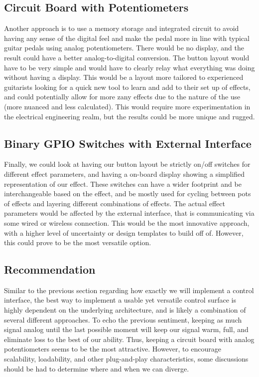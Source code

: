 \documentclass[onecolumn, draftclsnofoot,10pt, compsoc]{IEEEtran}
\begin{document}
\subsection{Circuit Board with Potentiometers}
	Another approach is to use a memory storage and integrated circuit to avoid having any sense of the digital feel and make the pedal more in line with typical guitar pedals using analog potentiometers. There would be no display, and the result could have a better analog-to-digital conversion. The button layout would have to be very simple and would have to clearly relay what everything was doing without having a display. This would be a layout more tailored to experienced guitarists looking for a quick new tool to learn and add to their set up of effects, and could potentially allow for more zany effects due to the nature of the use (more nuanced and less calculated). This would require more experimentation in the electrical engineering realm, but the results could be more unique and rugged\cite{Proto}. 
\subsection{Binary GPIO Switches with External Interface}
	Finally, we could look at having our button layout be strictly on/off switches for different effect parameters, and having a on-board display showing a simplified representation of our effect. These switches can have a wider footprint and be interchangeable based on the effect, and be mostly used for cycling between pots of effects and layering different combinations of effects. The actual effect parameters would be affected by the external interface, that is communicating via some wired or wireless connection. This would be the most innovative approach, with a higher level of uncertainty or design templates to build off of. However, this could prove to be the most versatile option. 
\subsection{Recommendation}
    Similar to the previous section regarding how exactly we will implement a control interface, the best way to implement a usable yet versatile control surface is highly dependent on the underlying architecture, and is likely a combination of several different approaches. To echo the previous sentiment, keeping as much signal analog until the last possible moment will keep our signal warm, full, and eliminate loss to the best of our ability. Thus, keeping a circuit board with analog potentiometers seems to be the most attractive. However, to encourage scalability, loadability, and other plug-and-play characteristics, some discussions should be had to determine where and when we can diverge. 
\end{document}
